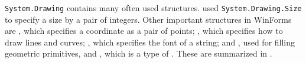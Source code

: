 \lstinline{System.Drawing} contains many often used structures.  used \lstinline!System.Drawing.Size! to specify a size by a pair of integers. Other important structures in WinForms are  , which specifies a coordinate as a pair of points; , which specifies how to draw lines and curves; , which specifies the font of a string;  and , used for filling geometric primitives, and , which is a type of . These are summarized in .

